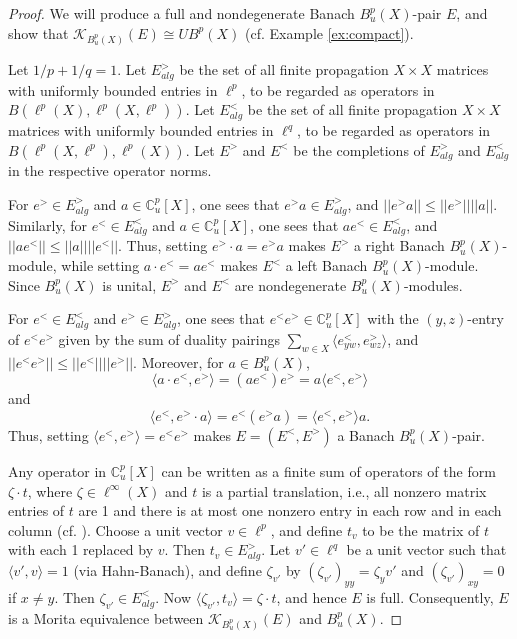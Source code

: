 \documentclass[a4,11pt]{amsart}
\theoremstyle{remark}
\begin{document}
\begin{proof} 
We will produce a full and nondegenerate Banach $B^p_u(X)$-pair $E$, and show that $\mathcal{K}_{B^p_u(X)}(E)\cong UB^p(X)$ (cf. Example \ref{ex:compact}).

Let $1/p+1/q=1$.
Let $E^>_{alg}$ be the set of all finite propagation $X\times X$ matrices with uniformly bounded entries in $\ell^p$, to be regarded as operators in $B(\ell^p(X),\ell^p(X,\ell^p))$.
Let $E^<_{alg}$ be the set of all finite propagation $X\times X$ matrices with uniformly bounded entries in $\ell^q$, to be regarded as operators in $B(\ell^p(X,\ell^p),\ell^p(X))$.
Let $E^>$ and $E^<$ be the completions of $E^>_{alg}$ and $E^<_{alg}$ in the respective operator norms.

For $e^>\in E^>_{alg}$ and $a\in\mathbb{C}^p_u[X]$, one sees that $e^>a\in E^>_{alg}$, and $||e^>a||\leq||e^>|| ||a||$.
Similarly, for $e^<\in E^<_{alg}$ and $a\in\mathbb{C}^p_u[X]$, one sees that $ae^<\in E^<_{alg}$, and $||ae^<||\leq||a|| ||e^<||$.
Thus, setting $e^>\cdot a=e^>a$ makes $E^>$ a right Banach $B^p_u(X)$-module, while setting $a\cdot e^<=ae^<$ makes $E^<$ a left Banach $B^p_u(X)$-module. 
Since $B^p_u(X)$ is unital, $E^>$ and $E^<$ are nondegenerate $B^p_u(X)$-modules.

For $e^<\in E^<_{alg}$ and $e^>\in E^>_{alg}$, one sees that $e^<e^>\in\mathbb{C}_u^p[X]$ with the $(y,z)$-entry of $e^<e^>$ given by the sum of duality pairings $\sum_{w\in X}\langle e^<_{yw},e^>_{wz}\rangle$, and $||e^<e^>||\leq ||e^<|| ||e^>||$. 
Moreover, for $a\in B^p_u(X)$,
\[ \langle a\cdot e^<,e^> \rangle = (ae^<)e^> = a\langle e^<,e^> \rangle \] and
\[ \langle e^<,e^>\cdot a \rangle = e^<(e^>a) = \langle e^<,e^> \rangle a. \]
Thus, setting $\langle e^<,e^> \rangle=e^<e^>$ makes $E=(E^<,E^>)$ a Banach $B^p_u(X)$-pair. 



Any operator in $\mathbb{C}^p_u[X]$ can be written as a finite sum of operators of the form $\zeta\cdot t$, where $\zeta\in\ell^\infty(X)$ and $t$ is a partial translation, i.e., all nonzero matrix entries of $t$ are 1 and there is at most one nonzero entry in each row and in each column (cf. \cite[Definition 2.9]{Chung21a}).
Choose a unit vector $v\in\ell^p$, and define $t_v$ to be the matrix of $t$ with each 1 replaced by $v$. Then $t_v\in E^>_{alg}$.
Let $v'\in\ell^q$ be a unit vector such that $\langle v',v \rangle=1$ (via Hahn-Banach), and define $\zeta_{v'}$ by $(\zeta_{v'})_{yy}=\zeta_yv'$ and $(\zeta_{v'})_{xy}=0$ if $x\neq y$. Then $\zeta_{v'}\in E^<_{alg}$.
Now $\langle \zeta_{v'},t_v \rangle=\zeta\cdot t$, and hence $E$ is full.
Consequently, $E$ is a Morita equivalence between $\mathcal{K}_{B^p_u(X)}(E)$ and $B^p_u(X)$.


\end{proof}
\end{document}
